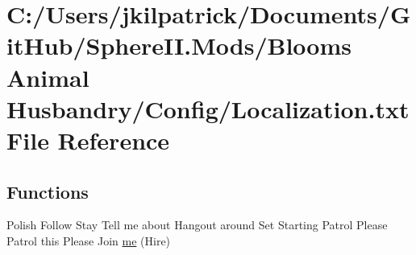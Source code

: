 \hypertarget{_blooms_01_animal_01_husbandry_2_config_2_localization_8txt}{}\section{C\+:/\+Users/jkilpatrick/\+Documents/\+Git\+Hub/\+Sphere\+II.Mods/\+Blooms Animal Husbandry/\+Config/\+Localization.txt File Reference}
\label{_blooms_01_animal_01_husbandry_2_config_2_localization_8txt}
\subsection*{Functions}
\begin{DoxyCompactItemize}
\item 
Polish Follow Stay Tell me about Hangout around Set Starting Patrol Please Patrol this Please Join \mbox{\hyperlink{_blooms_01_animal_01_husbandry_2_config_2_localization_8txt_a290fbecf7c016b09bc675718400d6fca}{me}} (Hire)
\end{DoxyCompactItemize}

